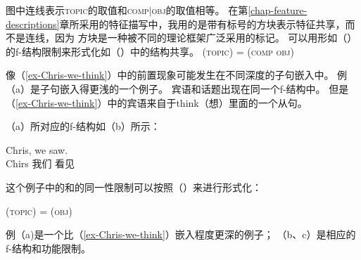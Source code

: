 \noindent
图中连线表示\textsc{topic}的取值和\textsc{comp$|$obj}的取值相等。
在第\ref{chap-feature-descriptions}章所采用的特征描写中，我用的是带有标号的方块表示特征共享，而不是连线，因为
方块是一种被不同的理论框架广泛采用的标记。
可以用形如（）的f-结构限制来形式化如（）中的结构共享。 
\ea
\label{Topic-Comp-Obj}
(\upsp  \textsc{topic}) = (\upsp \textsc{comp obj})
\z

\noindent
像（\ref{ex-Chris-we-think}）中的前置现象可能发生在不同深度的子句嵌入中。
例（a）是子句嵌入得更浅的一个例子。
宾语和话题出现在同一个f-结构中。
但是（\ref{ex-Chris-we-think}）中的宾语来自于think（想）里面的一个从句。

（a）所对应的f-结构如（b）所示：

\eal
\ex 
\gll Chris, we saw.\\
Chirs 我们 看见\\
\ex 
{}
\zl

\noindent
这个例子中的\topic{}和\lfgobj 的同一性限制可以按照（）来进行形式化：

\ea
\label{Topic-Obj}
(\upsp  \textsc{topic}) = (\upsp \textsc{obj})
\z

\noindent
例（a)是一个比（\ref{ex-Chris-we-think}）嵌入程度更深的例子；
（b、c）是相应的f-结构和功能限制。

